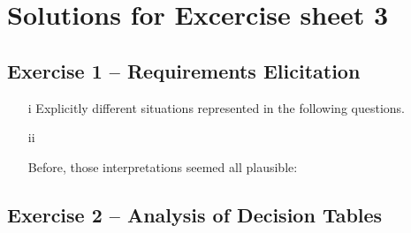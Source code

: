 \documentclass{scrartcl}
\begin{document}
\section*{Solutions for Excercise sheet 3}

\subsection*{Exercise 1 – Requirements Elicitation}
\begin{itemize}
    \item[i] Explicitly different situations represented in the following questions. \\
    \item[ii]
        
        Before, those interpretations seemed all plausible:
        
\end{itemize}



\subsection*{Exercise 2 – Analysis of Decision Tables}
\end{document}
